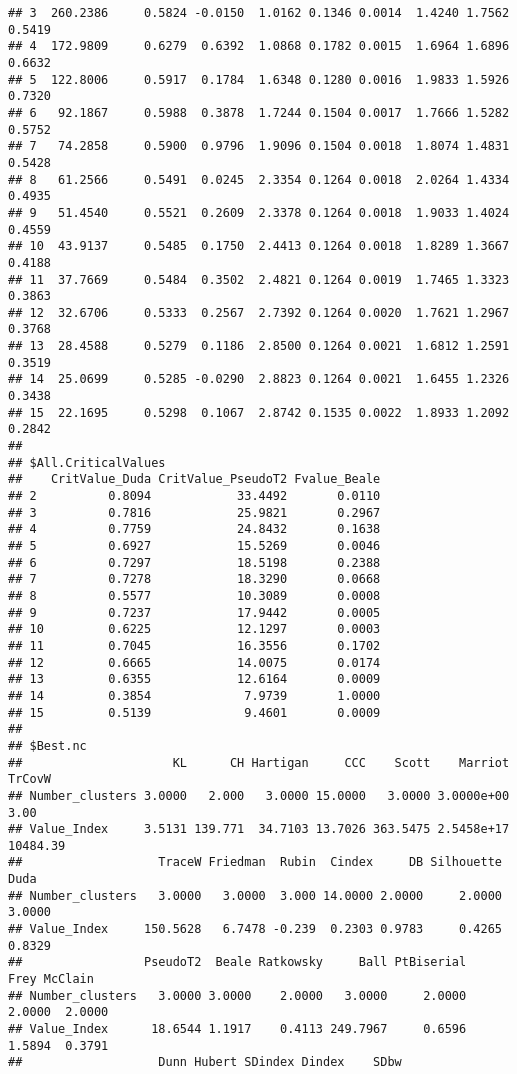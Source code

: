 \documentclass[
]{article}
\begin{document}
\begin{verbatim}
## 3  260.2386     0.5824 -0.0150  1.0162 0.1346 0.0014  1.4240 1.7562 0.5419
## 4  172.9809     0.6279  0.6392  1.0868 0.1782 0.0015  1.6964 1.6896 0.6632
## 5  122.8006     0.5917  0.1784  1.6348 0.1280 0.0016  1.9833 1.5926 0.7320
## 6   92.1867     0.5988  0.3878  1.7244 0.1504 0.0017  1.7666 1.5282 0.5752
## 7   74.2858     0.5900  0.9796  1.9096 0.1504 0.0018  1.8074 1.4831 0.5428
## 8   61.2566     0.5491  0.0245  2.3354 0.1264 0.0018  2.0264 1.4334 0.4935
## 9   51.4540     0.5521  0.2609  2.3378 0.1264 0.0018  1.9033 1.4024 0.4559
## 10  43.9137     0.5485  0.1750  2.4413 0.1264 0.0018  1.8289 1.3667 0.4188
## 11  37.7669     0.5484  0.3502  2.4821 0.1264 0.0019  1.7465 1.3323 0.3863
## 12  32.6706     0.5333  0.2567  2.7392 0.1264 0.0020  1.7621 1.2967 0.3768
## 13  28.4588     0.5279  0.1186  2.8500 0.1264 0.0021  1.6812 1.2591 0.3519
## 14  25.0699     0.5285 -0.0290  2.8823 0.1264 0.0021  1.6455 1.2326 0.3438
## 15  22.1695     0.5298  0.1067  2.8742 0.1535 0.0022  1.8933 1.2092 0.2842
## 
## $All.CriticalValues
##    CritValue_Duda CritValue_PseudoT2 Fvalue_Beale
## 2          0.8094            33.4492       0.0110
## 3          0.7816            25.9821       0.2967
## 4          0.7759            24.8432       0.1638
## 5          0.6927            15.5269       0.0046
## 6          0.7297            18.5198       0.2388
## 7          0.7278            18.3290       0.0668
## 8          0.5577            10.3089       0.0008
## 9          0.7237            17.9442       0.0005
## 10         0.6225            12.1297       0.0003
## 11         0.7045            16.3556       0.1702
## 12         0.6665            14.0075       0.0174
## 13         0.6355            12.6164       0.0009
## 14         0.3854             7.9739       1.0000
## 15         0.5139             9.4601       0.0009
## 
## $Best.nc
##                     KL      CH Hartigan     CCC    Scott    Marriot   TrCovW
## Number_clusters 3.0000   2.000   3.0000 15.0000   3.0000 3.0000e+00     3.00
## Value_Index     3.5131 139.771  34.7103 13.7026 363.5475 2.5458e+17 10484.39
##                   TraceW Friedman  Rubin  Cindex     DB Silhouette   Duda
## Number_clusters   3.0000   3.0000  3.000 14.0000 2.0000     2.0000 3.0000
## Value_Index     150.5628   6.7478 -0.239  0.2303 0.9783     0.4265 0.8329
##                 PseudoT2  Beale Ratkowsky     Ball PtBiserial   Frey McClain
## Number_clusters   3.0000 3.0000    2.0000   3.0000     2.0000 2.0000  2.0000
## Value_Index      18.6544 1.1917    0.4113 249.7967     0.6596 1.5894  0.3791
##                   Dunn Hubert SDindex Dindex    SDbw

\end{verbatim}
\end{document}
